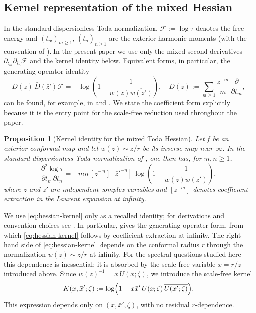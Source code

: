 \documentclass[11pt]{amsart}
\numberwithin{equation}{section}
\theoremstyle{plain}
\newtheorem{proposition}[theorem]{Proposition}
\theoremstyle{definition}
\theoremstyle{remark}
\begin{document}
\subsection{Kernel representation of the mixed Hessian}

In the standard dispersionless Toda normalization, $\mathcal F:=\log\tau$ denotes the free energy and
$(t_m)_{m\ge1}$, $(\bar t_n)_{n\ge1}$ are the exterior harmonic moments (with the convention of
\cite{WiegmannZabrodin2000,BOOKtau,MarshakovWiegmannZabrodin2002}). In the present paper we use
only the mixed second derivatives $\partial_{t_m}\partial_{\bar t_n}\mathcal F$ and the kernel identity below.
Equivalent forms, in particular, the generating-operator identity
\[
D(z)\,\bar D(\bar z')\mathcal F=-\log\!\left(1-\frac{1}{w(z)\overline{w(z')}}\right), \quad D(z):=\sum_{m\ge1}\frac{z^{-m}}{m}\,\frac{\partial}{\partial t_m},
\]
can be found, for example, in
\cite[Eq.~(42)]{BOOKtau} and \cite[\S4]{MarshakovWiegmannZabrodin2002}. We state the
coefficient form explicitly because it is the entry point for the scale-free reduction used
throughout the paper.


\begin{proposition}[Kernel identity for the mixed Toda Hessian]
	\label{prop:kernel-hessian}
	Let $f$ be an exterior conformal map and let $w(z)\sim z/r$ be its inverse
map near $\infty$. In the standard dispersionless Toda normalization of
\cite{WiegmannZabrodin2000,BOOKtau,MarshakovWiegmannZabrodin2002}, one then has, for
	$m,n\ge1$,
	\begin{equation}\label{eq:hessian-kernel}
		\frac{\partial^2\log\tau}{\partial t_m\,\partial\bar t_n}
		=
		-mn\,[z^{-m}][\bar z'^{-n}]\,
		\log\!\left(1-\frac{1}{w(z)\overline{w(z')}}\right),
	\end{equation}
	where $z$ and $z'$ are independent complex variables and $[z^{-m}]$ denotes coefficient extraction
	in the Laurent expansion at infinity.
\end{proposition}

We use \eqref{eq:hessian-kernel} only as a recalled identity; for derivations and convention choices see
\cite{WiegmannZabrodin2000,BOOKtau,MarshakovWiegmannZabrodin2002}. In particular,
\cite[Eq.~(42)]{BOOKtau} gives the generating-operator form, from which \eqref{eq:hessian-kernel}
follows by coefficient extraction at infinity. The right-hand side of \eqref{eq:hessian-kernel} depends on the conformal radius $r$ through the
normalization $w(z)\sim z/r$ at infinity. For the spectral questions studied here this dependence is
inessential: it is absorbed by the scale-free variable $x=r/z$ introduced above. Since
$w(z)^{-1}=x\,U(x;\zeta)$, we introduce the scale-free kernel
\begin{equation}\label{eq:kernel-scaled}
	K(x,\bar x';\zeta)
	:=
	\log\Bigl(1-x\bar x'\,U(x;\zeta)\,\overline{U(x';\zeta)}\Bigr).
\end{equation}
This expression depends only on $(x,\bar x',\zeta)$, with no residual $r$-dependence.
\end{document}
